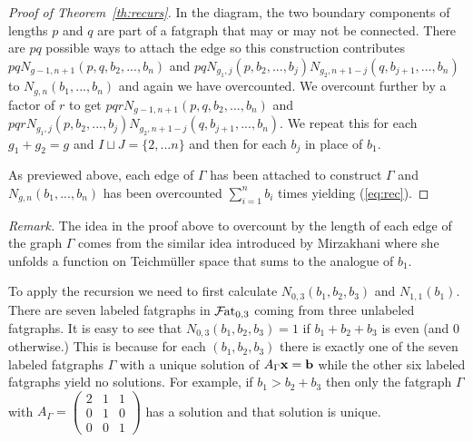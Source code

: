 \documentclass{amsart}
\newcommand{\f}{\mathcal{F}}
\newcommand{\fato}{\f\hspace{-.3mm}{\rm at}}
\begin{document}
\begin{proof}[Proof of Theorem~\ref{th:recurs}]
In the diagram, the two boundary components of lengths $p$ and $q$ are part of a fatgraph that may or may not be connected.
There are $pq$ possible ways to attach the edge so this construction contributes $pqN_{g-1,n+1}(p,q,b_2,...,b_n)$ and $pqN_{g_1,j}(p,b_2,...,b_j)N_{g_2,n+1-j}(q,b_{j+1},...,b_n)$ to $N_{g,n}(b_1,...,b_n)$ and again we have overcounted.  We overcount further by a factor of $r$ to get $pqrN_{g-1,n+1}(p,q,b_2,...,b_n)$ and $pqrN_{g_1,j}(p,b_2,...,b_j)N_{g_2,n+1-j}(q,b_{j+1},...,b_n)$.  We repeat this for each $g_1+g_2=g$ and $I\sqcup J=\{2,...n\}$ and then for each $b_j$ in place of $b_1$.

As previewed above, each edge of $\Gamma$ has been attached to construct $\Gamma$ and $N_{g,n}(b_1,...,b_n)$  has been overcounted $\sum_{i=1}^nb_i$ times yielding (\ref{eq:rec}).
\end{proof}
{\em Remark.}  The idea in the proof above to overcount by the length of each edge of the graph $\Gamma$ comes from the similar idea introduced by Mirzakhani \cite{MirSim} where she unfolds a function on Teichm\"uller space that sums to the analogue of $b_1$.

To apply the recursion we need to first calculate $N_{0,3}(b_1,b_2,b_3)$ and $N_{1,1}(b_1)$.  There are seven labeled fatgraphs in $\fato_{0,3}$ coming from three unlabeled fatgraphs.  It is easy to see that $N_{0,3}(b_1,b_2,b_3)=1$ if $b_1+b_2+b_3$ is even (and 0 otherwise.)  This is because for each $(b_1,b_2,b_3)$ there is exactly one of the seven labeled fatgraphs $\Gamma$ with a unique solution of $A_{\Gamma}{\bf x}={\bf b}$ while the other six labeled fatgraphs yield no solutions.  For example, if $b_1>b_2+b_3$ then only the fatgraph $\Gamma$ with $A_{\Gamma}=\left(\begin{array}{ccc}2&1&1\\0&1&0\\0&0&1\end{array}\right)$ has a solution and that solution is unique.
\end{document}
